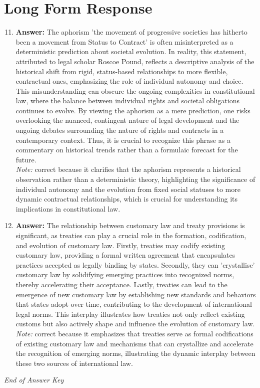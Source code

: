 \documentclass[12pt]{article}
\begin{document}
\section*{Long Form Response}
\begin{enumerate}[label=\arabic*.]
\setcounter{enumi}{10}
\item \textbf{Answer:} The aphorism 'the movement of progressive societies has hitherto been a movement from Status to Contract' is often misinterpreted as a deterministic prediction about societal evolution. In reality, this statement, attributed to legal scholar Roscoe Pound, reflects a descriptive analysis of the historical shift from rigid, status-based relationships to more flexible, contractual ones, emphasizing the role of individual autonomy and choice. This misunderstanding can obscure the ongoing complexities in constitutional law, where the balance between individual rights and societal obligations continues to evolve. By viewing the aphorism as a mere prediction, one risks overlooking the nuanced, contingent nature of legal development and the ongoing debates surrounding the nature of rights and contracts in a contemporary context. Thus, it is crucial to recognize this phrase as a commentary on historical trends rather than a formulaic forecast for the future.
\\ \textit{Note:} correct because it clarifies that the aphorism represents a historical observation rather than a deterministic theory, highlighting the significance of individual autonomy and the evolution from fixed social statuses to more dynamic contractual relationships, which is crucial for understanding its implications in constitutional law.
\item \textbf{Answer:} The relationship between customary law and treaty provisions is significant, as treaties can play a crucial role in the formation, codification, and evolution of customary law. Firstly, treaties may codify existing customary law, providing a formal written agreement that encapsulates practices accepted as legally binding by states. Secondly, they can 'crystallise' customary law by solidifying emerging practices into recognized norms, thereby accelerating their acceptance. Lastly, treaties can lead to the emergence of new customary law by establishing new standards and behaviors that states adopt over time, contributing to the development of international legal norms. This interplay illustrates how treaties not only reflect existing customs but also actively shape and influence the evolution of customary law.
\\ \textit{Note:} correct because it emphasizes that treaties serve as formal codifications of existing customary law and mechanisms that can crystallize and accelerate the recognition of emerging norms, illustrating the dynamic interplay between these two sources of international law.
\end{enumerate}

\vfill
\noindent\textit{End of Answer Key}
\end{document}
